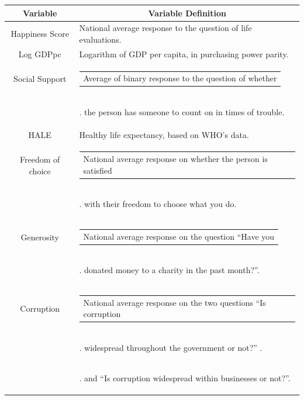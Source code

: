 \documentclass[12pt]{extarticle}
\begin{document}
\begin{longtable}[c]{cl}
    \rowcolor[HTML]{C0C0C0} 
    \textbf{Variable} & \multicolumn{1}{c}{\cellcolor[HTML]{C0C0C0}\textbf{Variable Definition}} \\\hline \endhead
             Happiness Score & National average response to the question of life evaluations. \\\hline
             Log GDPpc & Logarithm of GDP per capita, in purchasing power parity. \\\hline
             Social Support & \begin{tabular}{@{}l@{}}Average of binary response to the question of whether \end{tabular} \\
             & \begin{tabular}. the person has someone to count on in times of trouble.  \end{tabular}\\\hline
             
             HALE & Healthy life expectancy, based on WHO’s data. \\\hline
             
             Freedom of choice & \begin{tabular}{@{}l@{}}National average response on whether the person is satisfied \end{tabular} \\
             & \begin{tabular}. with their freedom to choose what you do.  \end{tabular}\\\hline
             
             Generosity & \begin{tabular}{@{}l@{}}National average response on the question “Have you  \end{tabular} \\
             & \begin{tabular}. donated money to a charity in the past month?”.\end{tabular}\\\hline
             
             Corruption & \begin{tabular}{@{}l@{}}National average response on the two questions “Is corruption \end{tabular} \\
             & \begin{tabular}. widespread throughout the government or not?” .\end{tabular}\\
             &  \begin{tabular}. and “Is corruption widespread within businesses or not?”.\end{tabular}\\\hline
             

\end{longtable}
\end{document}
